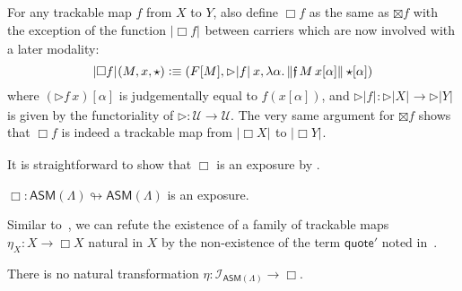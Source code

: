 \documentclass[a4paper,UKenglish,numberwithinsect,cleveref,thm-restate]{lipics-v2021}
\newcommand{\trunc}[2]{\mathopen{}\left\Vert #2\right\Vert_{#1}\mathclose{}}
\newcommand{\tproj}[3][]{\mathopen{}\left|#3\right|_{#2}^{#1}\mathclose{}}
\newcommand{\brck}[1]{\trunc{}{#1}}
\newcommand{\bproj}[1]{\tproj{}{#1}}
\newcommand{\ASM}{\mathsf{ASM}}
\newcommand{\defeq}{\vcentcolon\equiv}
\newcommand{\Univ}{\mathcal{U}}
\theoremstyle{plain}
\begin{document}
For any trackable map $f$ from $X$ to $Y$, also define $\Box f$ as the same as $\boxtimes f$ with the exception of the function $\bproj{\Box f}$ between carriers which are now involved with a later modality:
\[
  \bproj{\Box f}(M, x, \star) \defeq (F[M], \rhd \bproj{f}\, x, \lambda \alpha.\, \brck{\mathfrak{f}\,M\,x[\alpha]}\,{\star}[\alpha])
\]
where $(\rhd f\, x)[\alpha]$ is judgementally equal to $f(x[\alpha])$, and $\rhd \bproj{f} : \rhd\bproj{X} \to \rhd\bproj{Y}$ is given by the functoriality of $\mathord{\rhd}\colon \Univ \to \Univ$.
The very same argument for $\boxtimes f$ shows that $\Box f$ is indeed a trackable map from $\bproj{\Box X}$ to $\bproj{\Box Y}$.

It is straightforward to show that $\Box$ is an exposure by .
\begin{theorem}\label{thm:GL-exposure}
  $\Box \colon \ASM(\Lambda) \looparrowright \ASM(\Lambda)$ is an exposure.
\end{theorem}

Similar to~, we can refute the existence of a family of trackable maps $\eta_X\colon X \to \Box X$ natural in $X$ by the non-existence of the term $\mathsf{quote}'$ noted in~.
\begin{theorem}\label{thm:GL-no-quoting}
  There is no natural transformation $\eta\colon  \mathcal{I}_{\ASM(\Lambda)} \to \Box$.
\end{theorem}
\end{document}
